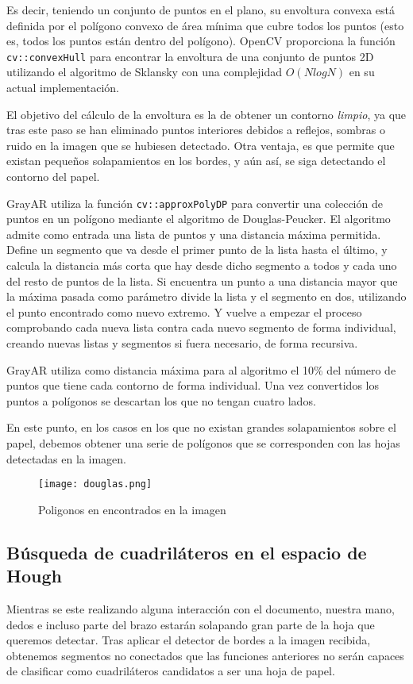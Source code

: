 Es decir, teniendo un conjunto de puntos en el plano, su envoltura convexa está definida por el
polígono convexo de área mínima que cubre todos los puntos (esto es, todos los puntos están dentro
del polígono). OpenCV proporciona la función \texttt{cv::convexHull} para encontrar la envoltura de
una conjunto de puntos 2D utilizando el algoritmo de Sklansky con una complejidad $O(N log N)$ en su
actual implementación.

El objetivo del cálculo de la envoltura es la de obtener un contorno \emph{limpio}, ya que tras este
paso se han eliminado puntos interiores debidos a reflejos, sombras o ruido en la imagen que se hubiesen
detectado. Otra ventaja, es que permite que existan pequeños solapamientos en los bordes, y aún así, se
siga detectando el contorno del papel.

GrayAR utiliza la función \texttt{cv::approxPolyDP}  para convertir una colección de puntos en un
polígono mediante el algoritmo de Douglas-Peucker. El algoritmo admite como entrada una lista de
puntos y una distancia máxima permitida. Define un segmento que va desde el primer punto de la lista
hasta el último, y calcula la distancia más corta que hay desde dicho segmento a todos y cada uno
del resto de puntos de la lista. Si encuentra un punto a una distancia mayor que la máxima pasada
como parámetro divide la lista y el segmento en dos, utilizando el punto encontrado como nuevo
extremo. Y vuelve a empezar el proceso comprobando cada nueva lista contra cada nuevo segmento de
forma individual, creando nuevas listas y segmentos si fuera necesario, de forma recursiva.

GrayAR utiliza como distancia máxima para al algoritmo el 10\% del número de puntos que tiene cada
contorno de forma individual. Una vez convertidos los puntos a polígonos se descartan los que no
tengan cuatro lados.

En este punto, en los casos en los que no existan grandes solapamientos sobre el papel, debemos
obtener una serie de polígonos que se corresponden con las hojas detectadas en la imagen.

\begin{figure}[h] 
  \centering
  \texttt{[image: douglas.png]}
  \caption{Poligonos en encontrados en la imagen}
  \label{fig:douglas}
\end{figure}



\subsection{Búsqueda de cuadriláteros en el espacio de Hough}
Mientras se este realizando alguna interacción con el documento, nuestra mano, dedos e incluso parte
del brazo estarán solapando gran parte de la hoja que queremos detectar. Tras aplicar el detector de
bordes a la imagen recibida, obtenemos segmentos no conectados que las funciones anteriores no serán
capaces de clasificar como cuadriláteros candidatos a ser una hoja de papel.

